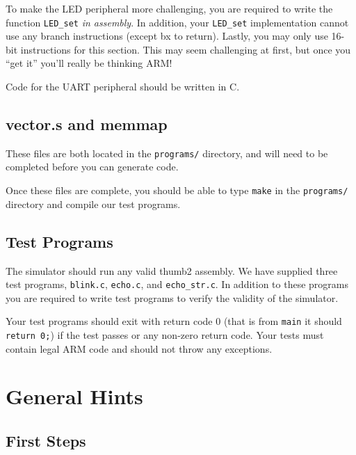 \documentclass{article}
\begin{document}
To make the LED peripheral more challenging, you are required to write the
function {\tt LED\_set} {\em in assembly}. In addition, your {\tt LED\_set}
implementation cannot use any branch instructions (except bx to return).
Lastly, you may only use 16-bit instructions for this section. This may seem
challenging at first, but once you ``get it'' you'll really be thinking ARM!

Code for the UART peripheral should be written in C.

\subsection{vector.s and memmap}

These files are both located in the {\tt programs/} directory, and will need
to be completed before you can generate code.

Once these files are complete, you should be able to type {\tt make} in the
{\tt programs/} directory and compile our test programs.

\subsection{Test Programs}

The simulator should run any valid thumb2 assembly. We have supplied three
test programs, {\tt blink.c}, {\tt echo.c}, and {\tt echo\_str.c}. In addition
to these programs you are required to write test programs to verify the
validity of the simulator.

Your test programs should exit with return code 0 (that is from {\tt main} it
should {\tt return 0;}) if the test passes or any non-zero return code. Your
tests must contain legal ARM code and should not throw any exceptions.

\section{General Hints}

\subsection{First Steps}
\label{sec:firststeps}
\end{document}
